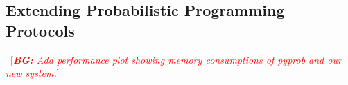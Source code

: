 \documentclass{article}
\newcommand{\bg}[1]{~{{[{\it \textcolor{red}{{\bf BG:} #1}}]}}}
\begin{document}
\subsection{Extending Probabilistic Programming Protocols}

\bg{Add performance plot showing memory consumptions of pyprob and our new system.}




\end{document}
